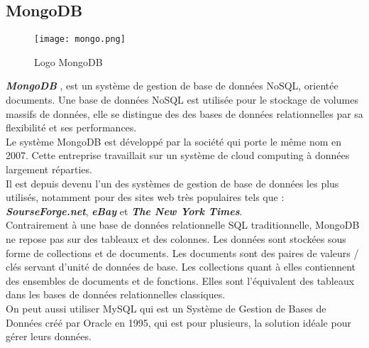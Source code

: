 \subsection{MongoDB}
\vspace{1cm}
\begin{figure}[H]
    \centering
    \texttt{[image: mongo.png]}
    \vspace{1cm}
    \captionsetup{justification=centering}
    \caption{Logo MongoDB}
    \label{fig:mongo_logo}
\end{figure}
\textit{\textbf{MongoDB}} \cite{mongodb} , est un système de gestion de base de données NoSQL, orientée documents. Une base de données NoSQL est utilisée pour le stockage de volumes massifs de données, elle se distingue des des bases de données relationnelles par sa flexibilité et ses performances.\\
\noindent Le système MongoDB est développé par la société qui porte le même nom en 2007. Cette entreprise travaillait sur un système de cloud computing à données largement réparties.\\
\noindent Il est depuis devenu l'un des systèmes de gestion de base de données les plus utilisés, notamment pour des sites web très populaires tels que : \textit{\textbf{SourseForge.net}}, \textit{\textbf{eBay}} et \textit{\textbf{The New York Times}}.\\
\noindent Contrairement à une base de données relationnelle SQL traditionnelle, MongoDB ne repose pas sur des tableaux et des colonnes. Les données sont stockées sous forme de collections et de documents.
Les documents sont des paires de valeurs / clés servant d'unité de données de base. Les collections quant à elles contiennent des ensembles de documents et de fonctions. Elles sont l'équivalent des tableaux dans les bases de données relationnelles classiques.\\
\noindent On peut aussi utiliser MySQL\cite{mysql} qui est un Système de Gestion de Bases de Données créé par Oracle en 1995, qui est pour plusieurs, la solution idéale pour gérer leurs données.
